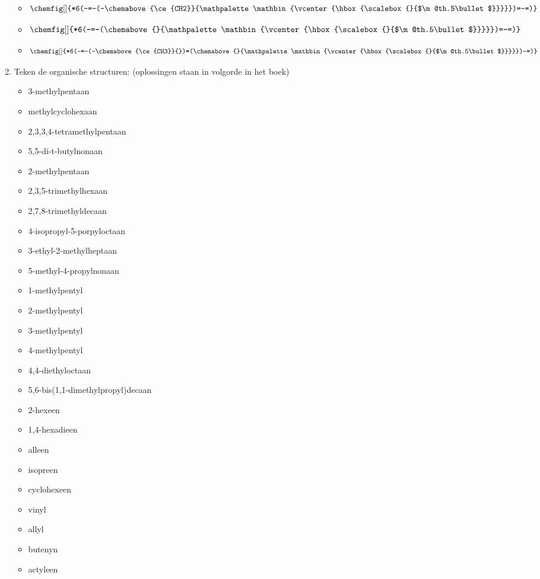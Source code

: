 \documentclass[a4paper,12pt]{article}
\makeatletter
\newcommand*\bigcdot{\mathpalette\bigcdot@{.5}}
\newcommand*\bigcdot@[2]{\mathbin{\vcenter{\hbox{\scalebox{#2}{$\m@th#1\bullet$}}}}}
\makeatother
\begin{document}
\begin{enumerate}
\begin{itemize}
                \item $$\chemfig[]{*6(-=-(-\chemabove{\ce{CH2}}{\bigcdot{}})=-=)}$$
                \item $$\chemfig[]{*6(-=-(\chemabove{}{\bigcdot{}})=-=)}$$
                \item $$\chemfig[]{*6(-=-(-\chemabove{\ce{CH3}}{})=(\chemabove{}{\bigcdot{}})-=)}$$
            \end{itemize}
        \item Teken de organische structuren: (oplossingen staan in volgorde in het boek)
            \begin{itemize}
                \item 3-methylpentaan
                \item methylcyclohexaan
                \item 2,3,3,4-tetramethylpentaan
                \item 5,5-di-t-butylnonaan
                \item 2-methylpentaan
                \item 2,3,5-trimethylhexaan
                \item 2,7,8-trimethyldecaan
                \item 4-isopropyl-5-porpyloctaan
                \item 3-ethyl-2-methylheptaan
                \item 5-methyl-4-propylnonaan
                \item 1-methylpentyl
                \item 2-methylpentyl
                \item 3-methylpentyl
                \item 4-methylpentyl
                \item 4,4-diethyloctaan
                \item 5,6-bis(1,1-dimethylpropyl)decaan
                \item 2-hexeen
                \item 1,4-hexadieen
                \item alleen 
                \item isopreen
                \item cyclohexeen
                \item vinyl
                \item allyl
                \item butenyn
                \item actyleen

\end{itemize}
\end{enumerate}
\end{document}
